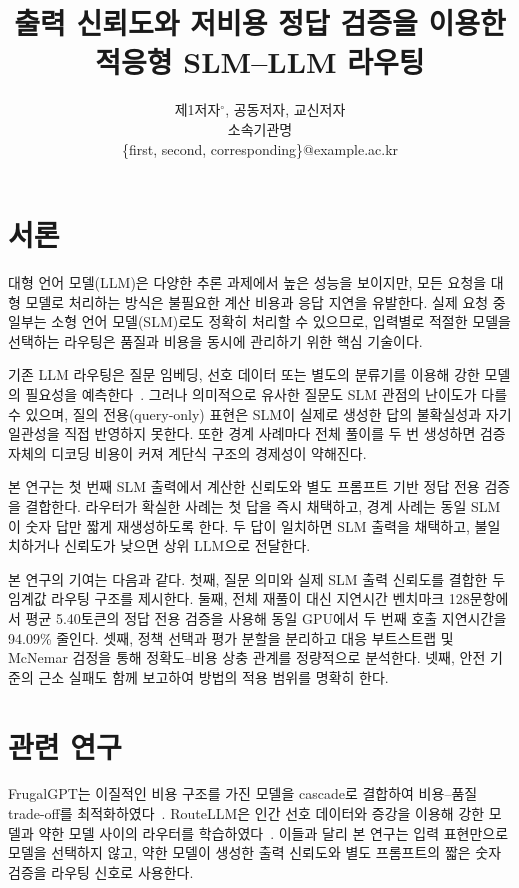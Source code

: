 \documentclass[preprint]{kcc}
\title{출력 신뢰도와 저비용 정답 검증을 이용한 적응형 SLM--LLM 라우팅}
\author{
제1저자$^{\circ}$, 공동저자, 교신저자\\
소속기관명\\
\{first, second, corresponding\}@example.ac.kr
}
\begin{document}
\maketitle

\section{서론}

대형 언어 모델(LLM)은 다양한 추론 과제에서 높은 성능을 보이지만, 모든 요청을 대형
모델로 처리하는 방식은 불필요한 계산 비용과 응답 지연을 유발한다. 실제 요청 중 일부는
소형 언어 모델(SLM)로도 정확히 처리할 수 있으므로, 입력별로 적절한 모델을 선택하는
라우팅은 품질과 비용을 동시에 관리하기 위한 핵심 기술이다.

기존 LLM 라우팅은 질문 임베딩, 선호 데이터 또는 별도의 분류기를 이용해 강한 모델의
필요성을 예측한다~\cite{chen2024frugalgpt,ong2025routellm}. 그러나 의미적으로 유사한
질문도 SLM 관점의 난이도가 다를 수 있으며, 질의 전용(query-only) 표현은 SLM이 실제로 생성한
답의 불확실성과 자기 일관성을 직접 반영하지 못한다. 또한 경계 사례마다 전체 풀이를
두 번 생성하면 검증 자체의 디코딩 비용이 커져 계단식 구조의 경제성이 약해진다.

본 연구는 첫 번째 SLM 출력에서 계산한 신뢰도와 별도 프롬프트 기반 정답 전용 검증을 결합한다.
라우터가 확실한 사례는 첫 답을 즉시 채택하고, 경계 사례는 동일 SLM이 숫자 답만 짧게
재생성하도록 한다. 두 답이 일치하면 SLM 출력을 채택하고, 불일치하거나 신뢰도가
낮으면 상위 LLM으로 전달한다.

본 연구의 기여는 다음과 같다. 첫째, 질문 의미와 실제 SLM 출력 신뢰도를 결합한
두 임계값 라우팅 구조를 제시한다. 둘째, 전체 재풀이 대신 지연시간 벤치마크 128문항에서
평균 5.40토큰의 정답 전용
검증을 사용해 동일 GPU에서 두 번째 호출 지연시간을 94.09\% 줄인다. 셋째, 정책 선택과
평가 분할을 분리하고 대응 부트스트랩 및 McNemar 검정을 통해 정확도--비용 상충 관계를
정량적으로 분석한다. 넷째, 안전 기준의 근소 실패도 함께 보고하여 방법의 적용 범위를
명확히 한다.

\section{관련 연구}

FrugalGPT는 이질적인 비용 구조를 가진 모델을 cascade로 결합하여 비용--품질
trade-off를 최적화하였다~\cite{chen2024frugalgpt}. RouteLLM은 인간 선호 데이터와
증강을 이용해 강한 모델과 약한 모델 사이의 라우터를 학습하였다~\cite{ong2025routellm}.
이들과 달리 본 연구는 입력 표현만으로 모델을 선택하지 않고, 약한 모델이 생성한
출력 신뢰도와 별도 프롬프트의 짧은 숫자 검증을 라우팅 신호로 사용한다.
\end{document}
